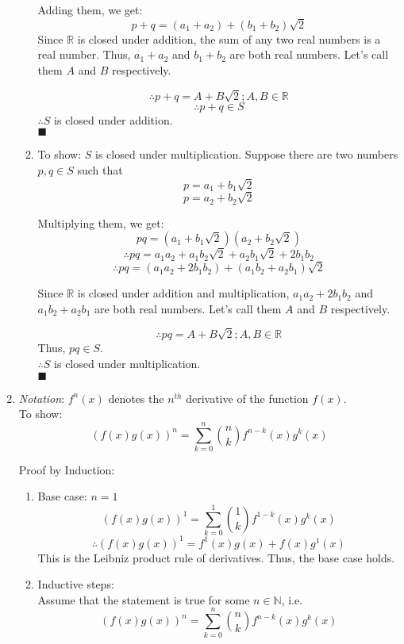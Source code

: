 \documentclass[a4paper,12pt]{article} %
\begin{document}
\begin{enumerate}
\begin{enumerate}
        Adding them, we get:
        $$ p + q = (a_1 + a_2) + (b_1 + b_2)\sqrt{2}$$
        Since $\mathbb{R}$ is closed under addition, the sum of any two real numbers is a real number.
        Thus, $a_1 + a_2$ and $b_1 + b_2$ are both real numbers. Let's call them $A$ and $B$ respectively.

        $$ \therefore p + q = A + B\sqrt{2}; A, B \in \mathbb{R}$$
        $$ \therefore p + q \in S$$
        $\therefore S$ is closed under addition.\\
        $\blacksquare$
      \item To show: $S$ is closed under multiplication.
        Suppose there are two numbers $p, q \in S$ such that
        $$p = a_1 + b_1\sqrt{2}$$
        $$p = a_2 + b_2\sqrt{2}$$

        Multiplying them, we get:
        $$pq = (a_1 + b_1\sqrt{2})(a_2 + b_2\sqrt{2})$$
        $$\therefore pq = a_1 a_2 + a_1 b_2\sqrt{2} + a_2 b_1\sqrt{2} + 2b_1b_2$$
        $$\therefore pq = (a_1a_2 + 2b_1b_2) + (a_1b_2 + a_2b_1)\sqrt{2}$$

        Since $\mathbb{R}$ is closed under addition and multiplication, $a_1a_2 + 2b_1b_2$ and $a_1b_2 + a_2b_1$ are both real numbers. Let's call them $A$ and $B$ respectively.

        $$\therefore pq = A + B\sqrt{2}; A, B \in \mathbb{R}$$
        Thus, $pq \in S$.\\
        $\therefore S$ is closed under multiplication.\\
        $\blacksquare$
    \end{enumerate}
  \item \textit{Notation}: $f^{n}(x)$ denotes the $n^{th}$ derivative of the function $f(x)$.\\
    To show:
    $$ (f(x) g(x))^n = \sum_{k=0}^{n} \binom{n}{k} f^{n-k}(x)g^{k}(x) $$

    Proof by Induction:\\
    \begin{enumerate}
      \item Base case: $n = 1$
        $$ (f(x) g(x))^1 = \sum_{k=0}^{1} \binom{1}{k} f^{1-k}(x)g^{k}(x) $$
        $$ \therefore (f(x)g(x))^1 = f^{1}(x)g(x) + f(x)g^{1}(x) $$
        This is the Leibniz product rule of derivatives. Thus, the base case holds.
      \item Inductive steps:\\
        Assume that the statement is true for some $n \in \mathbb{N}$, i.e.
        $$ (f(x) g(x))^n = \sum_{k=0}^{n} \binom{n}{k} f^{n-k}(x)g^{k}(x) $$


\end{enumerate}
\end{enumerate}
\end{document}
